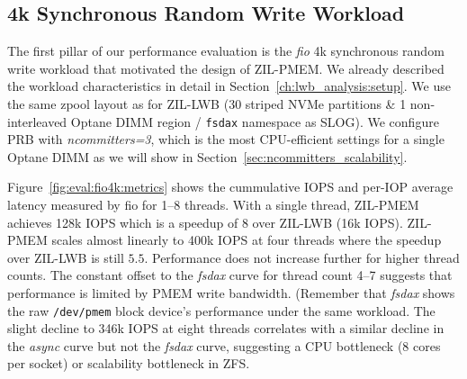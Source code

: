 \documentclass[12pt,a4paper,twoside]{book}
\begin{document}
\subsection{4k Synchronous Random Write Workload}\label{sec:eval:4ksyncwrites}
The first pillar of our performance evaluation is the \textit{fio} 4k synchronous random write workload that motivated the design of ZIL-PMEM.
We already described the workload characteristics in detail in Section~\ref{ch:lwb_analysis:setup}.
We use the same zpool layout as for ZIL-LWB (30 striped NVMe partitions \& 1 non-interleaved Optane DIMM region / \lstinline{fsdax} namespace as SLOG).
We configure PRB with \textit{ncommitters=3}, which is the most CPU-efficient settings for a single Optane DIMM as we will show in Section~\ref{sec:ncommitters_scalability}.

Figure~\ref{fig:eval:fio4k:metrics} shows the cummulative IOPS and per-IOP average latency measured by fio for 1--8 threads.
With a single thread, ZIL-PMEM achieves 128k IOPS which is a speedup of 8 over ZIL-LWB (16k IOPS).
ZIL-PMEM scales almost linearly to 400k IOPS at four threads where the speedup over ZIL-LWB is still $5.5$.
Performance does not increase further for higher thread counts.
The constant offset to the \textit{fsdax} curve for thread count 4--7 suggests that performance is limited by PMEM write bandwidth.
(Remember that \textit{fsdax} shows the raw \texttt{/dev/pmem} block device's performance under the same workload.
The slight decline to 346k IOPS at eight threads correlates with a similar decline in the \textit{async} curve but not the \textit{fsdax} curve, suggesting a CPU bottleneck (8 cores per socket) or scalability bottleneck in ZFS.
\end{document}
